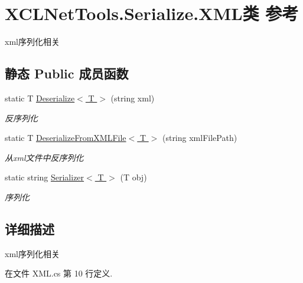 \hypertarget{class_x_c_l_net_tools_1_1_serialize_1_1_x_m_l}{\section{X\-C\-L\-Net\-Tools.\-Serialize.\-X\-M\-L类 参考}
\label{class_x_c_l_net_tools_1_1_serialize_1_1_x_m_l}
}


xml序列化相关  


\subsection*{静态 Public 成员函数}
\begin{DoxyCompactItemize}
\item 
static T \hyperlink{class_x_c_l_net_tools_1_1_serialize_1_1_x_m_l_a10f494104b432660b2cbfbd686425ff9}{Deserialize$<$ T $>$} (string xml)
\begin{DoxyCompactList}\small\item\em 反序列化 \end{DoxyCompactList}\item 
static T \hyperlink{class_x_c_l_net_tools_1_1_serialize_1_1_x_m_l_afdebd810bc96d095cab8ccdf8aaca684}{Deserialize\-From\-X\-M\-L\-File$<$ T $>$} (string xml\-File\-Path)
\begin{DoxyCompactList}\small\item\em 从xml文件中反序列化 \end{DoxyCompactList}\item 
static string \hyperlink{class_x_c_l_net_tools_1_1_serialize_1_1_x_m_l_a9540436b849eff236f8353cad8b20658}{Serializer$<$ T $>$} (T obj)
\begin{DoxyCompactList}\small\item\em 序列化 \end{DoxyCompactList}\end{DoxyCompactItemize}


\subsection{详细描述}
xml序列化相关 



在文件 X\-M\-L.\-cs 第 10 行定义.



